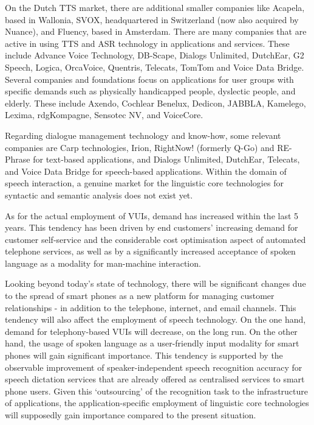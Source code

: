 \begin{multicols}{2}
   On the Dutch TTS market, there are additional smaller companies like Acapela, based in Wallonia, SVOX, headquartered in Switzerland (now also acquired by Nuance), and Fluency, based in Amsterdam. There are many companies that are active in using TTS and ASR technology in applications and services. These include Advance Voice Technology, DB-Scape, Dialogs Unlimited, DutchEar,   G2 Speech,  Logica, OrcaVoice, Quentris, Telecats, TomTom and Voice Data Bridge. Several companies and foundations focus on applications for user groups with specific demands such as physically handicapped people, dyslectic people, and elderly. These include Axendo, Cochlear Benelux, Dedicon, JABBLA, Kamelego, Lexima, rdgKompagne, Sensotec NV, and VoiceCore.

    Regarding dialogue management technology and know-how, some relevant companies are Carp technologies, Irion,  RightNow! (formerly Q-Go) and  RE-Phrase for text-based applications, and  Dialogs Unlimited, DutchEar, Telecats, and Voice Data Bridge for speech-based applications. Within the domain of speech interaction, a genuine market for the linguistic core technologies for syntactic and semantic analysis does not exist yet.

    As for the actual employment of VUIs, demand has increased within the last 5 years. This tendency has been driven by end customers' increasing demand for customer self-service and the considerable cost optimisation aspect of automated telephone services, as well as by a significantly increased acceptance of spoken language as a modality for man-machine interaction.

    Looking beyond today's state of technology, there will be significant changes due to the spread of smart phones as a new platform for managing customer relationships - in addition to the telephone, internet, and email channels. This tendency will also affect the employment of speech technology. On the one hand, demand for telephony-based VUIs will decrease, on the long run. On the other hand, the usage of spoken language as a user-friendly input modality for smart phones will gain significant importance. This tendency is supported by the observable improvement of speaker-independent speech recognition accuracy for speech dictation services that are already offered as centralised services to smart phone users. Given this `outsourcing' of the recognition task to the infrastructure of applications, the application-specific employment of linguistic core technologies will supposedly gain importance compared to the present situation.


\end{multicols}
